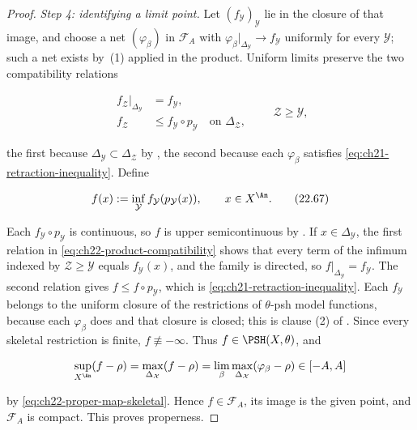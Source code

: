 \begin{proof}
\emph{Step 4: identifying a limit point.}  Let
\((f_{\mathcal Y})_{\mathcal Y}\) lie in the closure of that image, and
choose a net \((\varphi_\beta)\) in \(\mathcal F_A\) with
\(\varphi_\beta|_{\Delta_{\mathcal Y}}\to f_{\mathcal Y}\) uniformly for
every \(\mathcal Y\); such a net exists by
\,(1) applied in the product.  Uniform limits
preserve the two compatibility relations

\[
 \begin{aligned}
 f_{\mathcal Z}|_{\Delta_{\mathcal Y}}&=f_{\mathcal Y},\\
 f_{\mathcal Z}&\leq f_{\mathcal Y}\circ p_{\mathcal Y}
                    \quad\text{on }\Delta_{\mathcal Z},
 \end{aligned}
 \qquad \mathcal Z\geq\mathcal Y,
\tag{22.66}\label{eq:ch22-product-compatibility}
\]

the first because \(\Delta_{\mathcal Y}\subset\Delta_{\mathcal Z}\) by
, the second because each \(\varphi_\beta\)
satisfies \eqref{eq:ch21-retraction-inequality}.  Define

\[
           f(x):=\inf_{\mathcal Y}
                  f_{\mathcal Y}(p_{\mathcal Y}(x)),
           \qquad x\in X^{\An}.
\tag{22.67}\label{eq:ch22-product-limit-function}
\]

Each \(f_{\mathcal Y}\circ p_{\mathcal Y}\) is continuous, so \(f\) is upper
semicontinuous by .  If
\(x\in\Delta_{\mathcal Y}\), the first relation in
\eqref{eq:ch22-product-compatibility} shows that every term of the infimum
indexed by \(\mathcal Z\geq\mathcal Y\) equals \(f_{\mathcal Y}(x)\), and
the family is directed, so \(f|_{\Delta_{\mathcal Y}}=f_{\mathcal Y}\).  The
second relation gives \(f\leq f\circ p_{\mathcal Y}\), which is
\eqref{eq:ch21-retraction-inequality}.  Each \(f_{\mathcal Y}\) belongs to
the uniform closure of the restrictions of \(\theta\)-psh model functions,
because each \(\varphi_\beta\) does and that closure is closed; this is
clause (2) of .  Since every skeletal restriction is
finite, \(f\not\equiv-\infty\).  Thus \(f\in\PSH(X,\theta)\), and

\[
 \sup_{X^{\An}}(f-\rho)=\max_{\Delta_{\mathcal X}}(f-\rho)
 =\lim_\beta\max_{\Delta_{\mathcal X}}(\varphi_\beta-\rho)\in[-A,A]
\]

by \eqref{eq:ch22-proper-map-skeletal}.  Hence \(f\in\mathcal F_A\), its
image is the given point, and \(\mathcal F_A\) is compact.  This proves
properness.


\end{proof}
